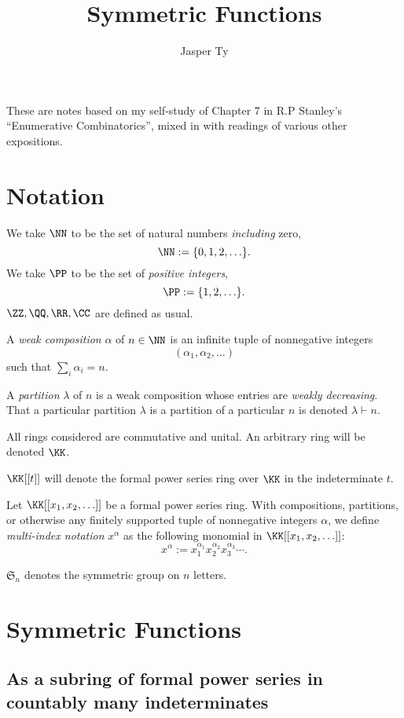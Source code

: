 \documentclass{article}
\title{Symmetric Functions}
\author{Jasper Ty}
\date{}
\newcommand{\frkS}{\mathfrak{S}}
\begin{document}
\maketitle

These are notes based on my self-study of Chapter 7 in R.P Stanley's ``Enumerative Combinatorics'', mixed in with readings of various other expositions. 


\tableofcontents

\section{Notation}
We take $\NN$ to be the set of natural numbers \textit{including} zero,
\[
    \NN := \{0,1,2,\ldots\}.
\]
We take $\PP$ to be the set of \textit{positive integers},
\[
    \PP := \{1,2,\ldots\}.
\]
$\ZZ,\QQ,\RR,\CC$ are defined as usual.

A \textit{weak composition} $\alpha$ of $n \in \NN$ is an infinite tuple of nonnegative integers 
\[
    (\alpha_1, \alpha_2, \ldots)
\]
such that $\sum_i \alpha_i = n$.

A \textit{partition} $\lambda$ of $n$ is a weak composition whose entries are \textit{weakly decreasing}. That a particular partition $\lambda$ is a partition of a particular $n$ is denoted $\lambda \vdash n$.

All rings considered are commutative and unital. An arbitrary ring will be denoted $\KK$.

$\KK[[t]]$ will denote the formal power series ring over $\KK$ in the indeterminate $t$.

Let $\KK[[x_1,x_2,\ldots]]$ be a formal power series ring. With compositions, partitions, or otherwise any finitely supported tuple of nonnegative integers $\alpha$, we define \textit{multi-index notation} $x^\alpha$ as the following monomial in $\KK[[x_1,x_2,\ldots]]$:
\[
    x^\alpha := x_1^{\alpha_1}x_2^{\alpha_2}x_3^{\alpha_3}\cdots.
\]

$\frkS_n$ denotes the symmetric group on $n$ letters.

\section{Symmetric Functions}
\subsection{As a subring of formal power series in countably many indeterminates}
\end{document}
